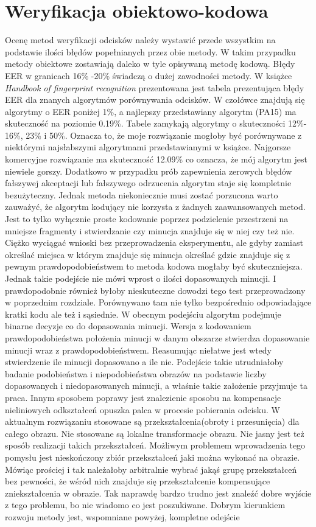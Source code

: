 \chapter{Weryfikacja obiektowo-kodowa}

Ocenę metod weryfikacji odcisków należy wystawić przede wszystkim na podstawie ilości błędów popełnianych przez obie metody. W takim przypadku metody obiektowe zostawiają daleko w tyle opisywaną metodę kodową. Błędy EER w granicach 16\% -20\% świadczą o dużej zawodności metody. W książce  \emph{Handbook of fingerprint recognition} \cite{finger_book} prezentowana jest tabela prezentująca błędy EER dla znanych algorytmów porównywania odcisków. W czołówce znajdują się algorytmy o EER poniżej 1\%, a najlepszy przedstawiany algorytm (PA15) ma skuteczność na poziomie 0.19\%. Tabele zamykają algorytmy o skuteczności 12\%- 16\%, 23\% i 50\%. Oznacza to, że moje rozwiązanie mogłoby być porównywane z niektórymi najsłabszymi algorytmami przedstawianymi w książce. Najgorsze komercyjne rozwiązanie ma skuteczność 12.09\% co oznacza, że mój algorytm jest niewiele gorszy. Dodatkowo w przypadku prób zapewnienia zerowych błędów fałszywej akceptacji lub fałszywego odrzucenia algorytm staje się kompletnie bezużyteczny. Jednak metoda niekoniecznie musi zostać porzucona warto zauważyć, że algorytm kodujący nie korzysta z żadnych zaawansowanych metod. Jest to tylko wyłącznie proste kodowanie poprzez podzielenie przestrzeni na mniejsze fragmenty i stwierdzanie czy minucja znajduje się w niej czy też nie. Ciężko wyciągać wnioski bez przeprowadzenia eksperymentu, ale gdyby zamiast określać miejsca w którym znajduje się minucja określać gdzie znajduje się z pewnym prawdopodobieństwem to metoda kodowa mogłaby być skuteczniejsza. Jednak takie podejście nie mówi wprost o ilości dopasowanych minucji. I prawdopodobnie również byłoby nieskuteczne dowodzi tego test przeprowadzony w poprzednim rozdziale. Porównywano tam nie tylko bezpośrednio odpowiadające kratki kodu ale też i sąsiednie. W obecnym podejściu algorytm podejmuje binarne decyzje co do dopasowania minucji. Wersja z kodowaniem prawdopodobieństwa położenia minucji w danym obszarze stwierdza dopasowanie minucji wraz z prawdopodobieństwem. Reasumując niełatwe jest wtedy stwierdzenie ile minucji dopasowano a ile nie. Podejście takie utrudniałoby badanie podobieństwa i niepodobieństwa obrazów na podstawie liczby dopasowanych i niedopasowanych minucji, a właśnie takie założenie przyjmuje ta praca. Innym sposobem poprawy jest znalezienie sposobu na kompensacje nieliniowych odkształceń opuszka palca w procesie pobierania odcisku. W aktualnym rozwiązaniu stosowane są przekształcenia(obroty i przesunięcia) dla całego obrazu. Nie stosowane są lokalne transformacje obrazu. Nie jasny jest też sposób realizacji takich przekształceń. Możliwym problemem wprowadzenia tego pomysłu jest nieskończony zbiór przekształceń jaki można wykonać na obrazie. Mówiąc prościej i tak należałoby arbitralnie wybrać jakąś grupę przekształceń bez pewności, że wśród nich znajduje się przekształcenie kompensujące zniekształcenia w obrazie. Tak naprawdę bardzo trudno jest znaleźć dobre wyjście z tego problemu, bo nie wiadomo co jest poszukiwane. Dobrym kierunkiem rozwoju metody jest, wspomniane powyżej, kompletne odejście 